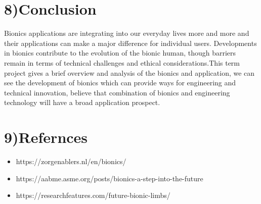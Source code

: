 \documentclass{report}
\begin{document}
\section*{8)Conclusion}
Bionics applications are integrating into our everyday lives more and more and their applications can make a major difference for individual users. Developments in bionics contribute to the evolution of the bionic human, though barriers remain in terms of technical challenges and ethical considerations.This term project gives a brief overview and analysis of the bionics and application, we can see the
development of bionics which can provide ways for engineering and technical innovation, believe that combination of bionics and engineering technology will have a broad application prospect. 
\section*{9)Refernces}
\begin{itemize}
\item https://zorgenablers.nl/en/bionics/
\item https://aabme.asme.org/posts/bionics-a-step-into-the-future
\item https://researchfeatures.com/future-bionic-limbs/
\end{itemize}
\end{document}
